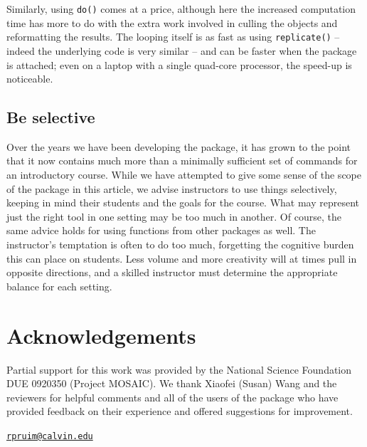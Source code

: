 Similarly, using \texttt{do()} comes at a price, although here the
increased computation time has more to do with the extra work involved
in culling the objects and reformatting the results. The looping itself
is as fast as using \texttt{replicate()} -- indeed the underlying code
is very similar -- and can be faster when the  package
is attached; even on a laptop with a single quad-core processor, the
speed-up is noticeable.

\subsection{Be selective}\label{be-selective}

Over the years we have been developing the  package, it has
grown to the point that it now contains much more than a minimally
sufficient set of commands for an introductory course. While we have
attempted to give some sense of the scope of the package in this
article, we advise instructors to use things selectively, keeping in
mind their students and the goals for the course. What may represent
just the right tool in one setting may be too much in another. Of
course, the same advice holds for using functions from other packages as
well. The instructor's temptation is often to do too much, forgetting
the cognitive burden this can place on students. Less volume and more
creativity will at times pull in opposite directions, and a skilled
instructor must determine the appropriate balance for each setting.

\section{Acknowledgements}\label{acknowledgements}

Partial support for this work was provided by the National Science
Foundation DUE 0920350 (Project MOSAIC). We thank Xiaofei (Susan) Wang
and the reviewers for helpful comments and all of the users of the
 package who have provided feedback on their experience and
offered suggestions for improvement.



\address{%
Randall Pruim\\
Calvin College\\
Department of Mathematics and Statistics\\ 3201 Burton St SE\\ Grand Rapids, MI 49546\\
}
\href{mailto:rpruim@calvin.edu}{\nolinkurl{rpruim@calvin.edu}}


